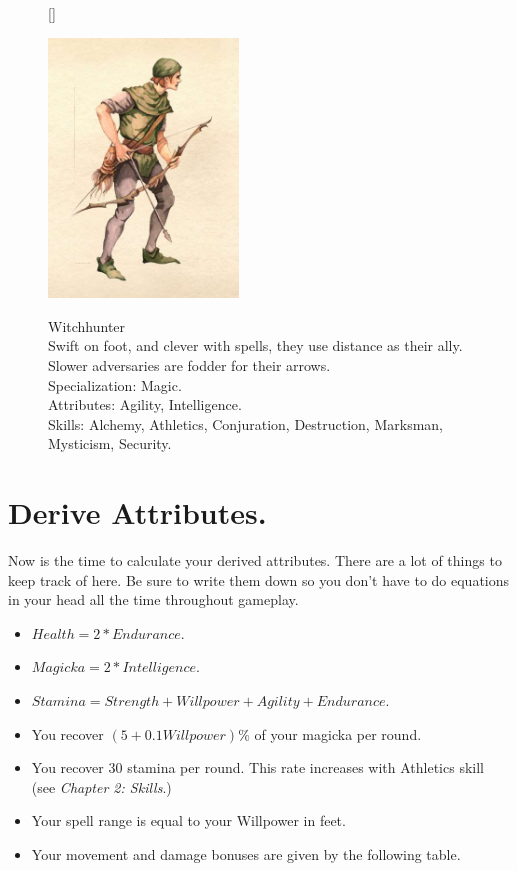 \documentclass[12pt]{book}
\begin{document}
\begin{figure}[H]
[\FBwidth]
{\caption*{Witchhunter\\

Swift on foot, and clever with spells, they use distance as their ally. Slower adversaries are fodder for their arrows.\\

Specialization: Magic.\\

Attributes: Agility, Intelligence.\\

Skills: Alchemy, Athletics, Conjuration, Destruction, Marksman, Mysticism, Security.}\label{fig:test}}
{\includegraphics[width=0.45\textwidth]{Witchhunter.png}}
\end{figure}

\newpage
\section{Derive Attributes.}
Now is the time to calculate your derived attributes. There are a lot of things to keep track of here. Be sure to write them down so you don't have to do equations in your head all the time throughout gameplay.
\begin{itemize}
	\item $Health=2*Endurance$.
	\item $Magicka=2*Intelligence$.
	\item $Stamina=Strength+Willpower+Agility+Endurance$.
	\item You recover $(5+0.1Willpower)\%$ of your magicka per round.
	\item You recover 30 stamina per round. This rate increases with Athletics skill (see \textit{Chapter 2: Skills}.)
	\item Your spell range is equal to your Willpower in feet. 
	\item Your movement and damage bonuses are given by the following table.
\end{itemize}
\end{document}
